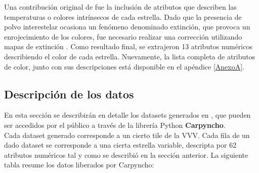 \par Una contribución original de \cite{jbc} fue la inclusión de atributos que describen las temperaturas o colores intrínsecos de cada estrella.  Dado que la presencia de polvo interestelar ocasiona un fenómeno denominado extinción, que provoca un enrojecimiento de los colores, fue necesario realizar una corrección utilizando mapas de extinción \cite{mcwilliam2011rr}. Como resultado final, se extrajeron 13 atributos numéricos describiendo el color de cada estrella. Nuevamente, la lista completa de atributos de color, junto con sus descripciones está disponible en el apéndice \ref{AnexoA}.

\subsection{Descripción de los datos}
\label{tiles_description}
En esta sección se describirán en detalle los datasets generados en \cite{jbc}, que pueden ser accedidos por el público a través de la librería Python \textbf{Carpyncho}\cite{carpynchoToolkit}.\\

Cada dataset generado corresponde a un cierto tile de la VVV. Cada fila de un dado dataset se corresponde a una cierta estrella variable, descripta por 62 atributos numéricos tal y como se describió en la sección anterior. La siguiente tabla resume los datos liberados por Carpyncho:

